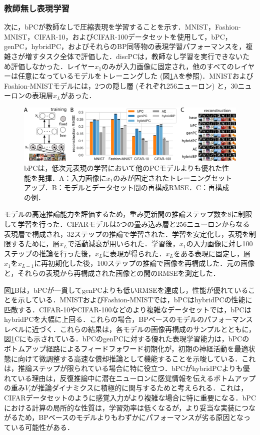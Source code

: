 \documentclass[a4paper, titlepage]{jsarticle}
\begin{document}
\subsubsection{教師無し表現学習}
次に，bPCが教師なしで圧縮表現を学習することを示す．MNIST，Fashion-MNIST，CIFAR-10，およびCIFAR-100データセットを使用して，bPC，genPC，hybridPC，およびそれらのBP同等物の表現学習パフォーマンスを，複雑さが増すタスク全体で評価した．discPCは，教師なし学習を実行できないため評価しなかった．レイヤー$x_1$のみが入力画像に固定され，他のすべてのレイヤーは任意になっているモデルをトレーニングした (図\ref{ex_result2}Aを参照)．MNISTおよびFashion-MNISTモデルには，2つの隠し層 (それぞれ256ニューロン) と，30ニューロンの表現層$x_L$があった．
\begin{figure}[htbp]
   \centering
   \includegraphics[scale=0.25]{x4.png}
   \caption{bPCは，低次元表現の学習において他のPCモデルよりも優れた性能を発揮．A：入力画像に$x_1$のみが固定されたトレーニングセットアップ．B：モデルとデータセット間の再構成RMSE．C：再構成の例．}
   \label{ex_result2}
\end{figure}
モデルの高速推論能力を評価するため，重み更新間の推論ステップ数を8に制限して学習を行った．CIFARモデルは5つの畳み込み層と256ニューロンからなる表現層で構成され，32ステップの推論で学習された．学習を安定化し，表現を制限するために，層$x_L$で活動減衰が用いられた．学習後，$x_1$の入力画像に対し100ステップの推論を行った後，$x_L$に表現が得られた．$x_L$をある表現に固定し，層$x_1$を$x_{L−1}$に再初期化した後，100ステップの推論で画像を再構成した．元の画像と，それらの表現から再構成された画像との間のRMSEを測定した．
\par
図\ref{ex_result2}Bは，bPCが一貫してgenPCよりも低いRMSEを達成し，性能が優れていることを示している．MNISTおよびFashion-MNISTでは，bPCはhybridPCの性能に匹敵する．CIFAR-10やCIFAR-100などのより複雑なデータセットでは，bPCはhybridPCを大幅に上回る．これらの場合，BPベースのモデルのパフォーマンスレベルに近づく．これらの結果は，各モデルの画像再構成のサンプルとともに，図\ref{ex_result2}Cにも示されている．bPCのgenPCに対する優れた表現学習能力は，bPCのボトムアップ経路によるフィードフォワード初期化が，初期の神経活動を最適状態に向けて微調整する高速な償却推論として機能することを示唆している．これは，推論ステップが限られている場合に特に役立つ．bPCがhybridPCよりも優れている理由は，反復推論中に潜在ニューロンに感覚情報を伝えるボトムアップの重み$V_l$が推論ダイナミクスに積極的に関与するためと考えられる．これは，CIFARデータセットのように感覚入力がより複雑な場合に特に重要になる．bPCにおける計算の局所的な性質は，学習効率は低くなるが，より妥当な実装につながるため，BPベースのモデルよりもわずかにパフォーマンスが劣る原因となっている可能性がある．
\end{document}
